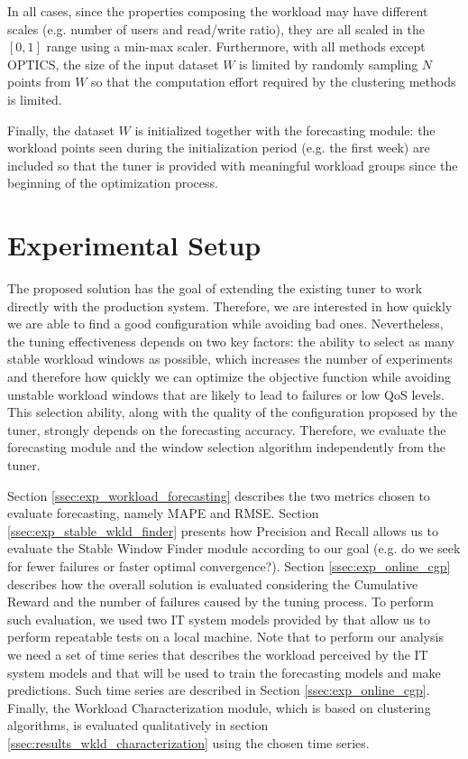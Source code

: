 \documentclass[a4paper, 12pt]{article} %
\begin{document}
	In all cases, since the properties composing the workload may have different scales (e.g. number of users and read/write ratio), they are all scaled in the $[0, 1]$ range using a min-max scaler.	Furthermore, with all methods except OPTICS, the size of the input dataset $W$ is limited by randomly sampling $N$ points from $W$ so that the computation effort required by the clustering methods is limited.	
	
	Finally, the dataset $W$ is initialized together with the forecasting module: the workload points seen during the initialization period (e.g. the first week) are included so that the tuner is provided with meaningful workload groups since the beginning of the optimization process.

	\section{Experimental Setup } \label{sec:exp_setup}
	The proposed solution has the goal of extending the existing tuner \cite{AkamasCGP} to work directly with the production system. Therefore, we are interested in how quickly we are able to find a good configuration while avoiding bad ones. Nevertheless, the tuning effectiveness depends on two key factors: the ability to select as many stable workload windows as possible, which increases the number of experiments and therefore how quickly we can optimize the objective function while avoiding unstable workload windows that are likely to lead to failures or low QoS levels. This selection ability,  along with the quality of the configuration proposed by the tuner, strongly depends on the forecasting accuracy.
	Therefore, we evaluate the forecasting module and the window selection algorithm independently from the tuner.
	
	Section \ref{ssec:exp_workload_forecasting} describes the two metrics chosen to evaluate forecasting, namely MAPE and RMSE. Section \ref{ssec:exp_stable_wkld_finder} presents how Precision and Recall allows us to evaluate the Stable Window Finder module according to our goal (e.g. do we seek for fewer failures or faster optimal convergence?). Section \ref{ssec:exp_online_cgp} describes how the overall solution is evaluated considering the Cumulative Reward and the number of failures caused by the tuning process. To perform such evaluation, we used two IT system models provided by \cite{AkamasCGP} that allow us to perform repeatable tests on a local machine. 
	Note that to perform our analysis we need a set of time series that describes the workload perceived by the IT system models and that will be used to train the forecasting models and make predictions. Such time series are described in Section \ref{ssec:exp_online_cgp}.
	Finally, the Workload Characterization module, which is based on clustering algorithms, is evaluated qualitatively in section \ref{ssec:results_wkld_characterization} using the chosen time series. 
	
\end{document}
